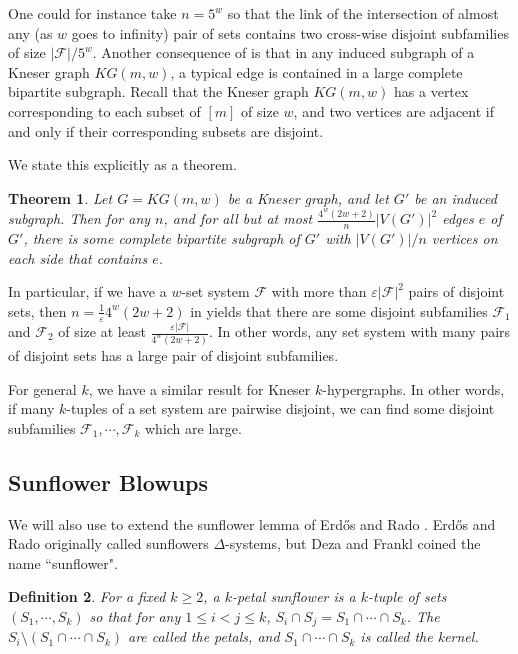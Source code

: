 \documentclass[12pt]{article}
\newtheorem{theorem}{Theorem}[section]
\newtheorem{definition}[theorem]{Definition}
\newcommand{\eps}{\varepsilon}
\newcommand{\F}{\mathcal{F}}
\begin{document}
One could for instance take $n=5^w$ so that the link of the intersection of almost any (as $w$ goes to infinity) pair of sets contains two cross-wise disjoint subfamilies of size $|\F|/5^w$.  Another consequence of  is that in any induced subgraph of a Kneser graph $KG(m,w)$, a typical edge is contained in a large complete bipartite subgraph.  Recall that the Kneser graph $KG(m,w)$ has a vertex corresponding to each subset of $[m]$ of size $w$, and two vertices are adjacent if and only if their corresponding subsets are disjoint.

We state this explicitly as a theorem.

\begin{theorem}
\label{thm:kneser}
	Let $G=KG(m,w)$ be a Kneser graph, and let $G'$ be an induced subgraph.  Then for any $n$, and for all but at most $\frac{4^w(2w+2)}{n}|V(G')|^2$ edges $e$ of $G'$, there is some complete bipartite subgraph of $G'$ with $|V(G')|/n$ vertices on each side that contains $e$. \end{theorem}
	
In particular, if we have a $w$-set system $\F$ with more than $\eps|\F|^2$ pairs of disjoint sets, then $n=\frac{1}{\eps}4^w(2w+2)$ in  yields that there are some disjoint subfamilies $\F_1$ and $\F_2$ of size at least $\frac{\eps|\F|}{4^w(2w+2)}$.  In other words, any set system with many pairs of disjoint sets has a large pair of disjoint subfamilies.

For general $k$, we have a similar result for Kneser $k$-hypergraphs.  In other words, if many $k$-tuples of a set system are pairwise disjoint, we can find some disjoint subfamilies $\F_1, \cdots, \F_k$ which are large.

\subsection{Sunflower Blowups}
\label{sfs}

We will also use  to extend the sunflower lemma of Erd\H{o}s and Rado \cite{ErdosR1960}.  Erd\H{o}s and Rado originally called sunflowers $\Delta$-systems, but Deza and Frankl \cite{deza1981every} coined the name ``sunflower". 

\begin{definition}
	For a fixed $k \ge 2$, a $k$-petal \emph{sunflower} is a $k$-tuple of sets $(S_1, \cdots, S_k)$ so that for any $1 \le i<j \le k$, $S_i \cap S_j=S_1 \cap \cdots \cap S_k$.  The $S_i \setminus (S_1 \cap \cdots \cap S_k)$ are called the \emph{petals}, and $S_1 \cap \cdots \cap S_k$ is called the \emph{kernel}. \end{definition}
	
\end{document}
